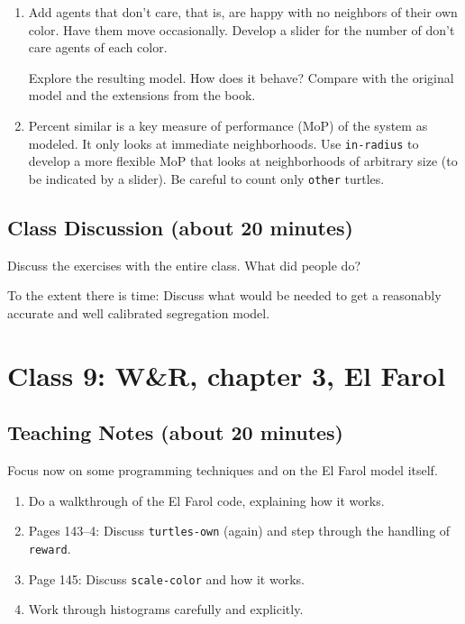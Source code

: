 \begin{enumerate}
\item Add agents that don't care, that is, are happy with no neighbors of their own color. Have them move occasionally. Develop a slider for the number of don't care agents of each color.

Explore the resulting model. How does it behave? Compare with the original model and the extensions from the book.

\item Percent similar is a key measure of performance (MoP) of the system as modeled. It only looks at immediate neighborhoods. Use \texttt{in-radius} to develop a more flexible MoP that looks at neighborhoods of arbitrary size (to be indicated by a slider). Be careful to count only \texttt{other} turtles.
\end{enumerate}

\section{Class Discussion (about 20 minutes)}

Discuss the exercises with the entire class. What did people do?

To the extent there is time: Discuss what would be needed to get a reasonably accurate and well calibrated segregation model.

\chapter{Class 9: W\&R, chapter 3, El Farol}

\section{Teaching Notes (about 20 minutes)}

Focus now on some programming techniques and on the El Farol model itself.
\begin{enumerate}
\item Do a walkthrough of the El Farol code, explaining how it works.
\item Pages 143--4: Discuss \texttt{turtles-own} (again) and step through the handling of \texttt{reward}.
\item Page 145: Discuss \texttt{scale-color} and how it works.
\item Work through histograms carefully and explicitly.
\end{enumerate}

